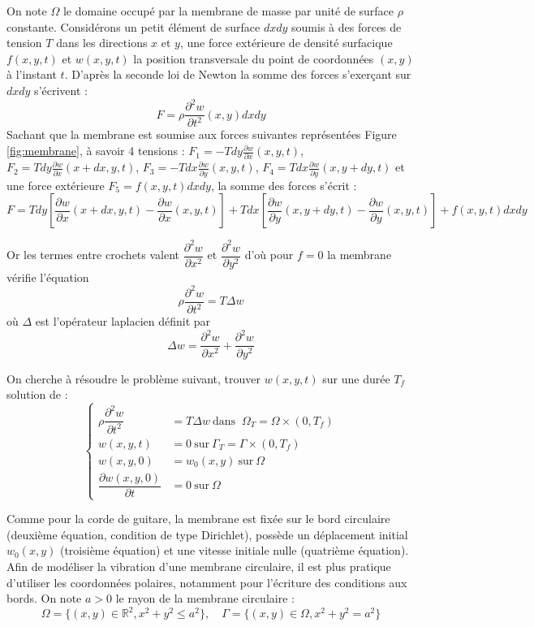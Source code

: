 \documentclass[a4,12pt]{article}
\newcommand{\R}{\mathbb{R}}
\begin{document}
  On note $\Omega$ le domaine occupé par la membrane de masse par unité de surface $\rho$ constante. Considérons un petit élément de surface $dxdy$ soumis à des forces de tension $T$  dans les directions $x$ et $y$, une force extérieure de densité surfacique $f(x,y,t)$ et $w(x,y,t)$ la position transversale du point de coordonnées $(x,y)$ à l'instant $t$. D'après la seconde loi de Newton la somme des forces s'exerçant sur $dxdy$ s'écrivent : 
  \[
    F=\rho  \frac{\partial^2 w}{\partial t^2}(x,y)dxdy
  \]
  Sachant que la membrane est soumise aux forces suivantes représentées Figure \ref{fig:membrane}, à savoir 4 tensions : $F_1=-Tdy\frac{\partial w}{\partial x}(x,y,t)$, $F_2=Tdy\frac{\partial w}{\partial x}(x+dx,y,t)$, $F_3=-Tdx\frac{\partial w}{\partial y}(x,y,t)$, $F_4=Tdx\frac{\partial w}{\partial y}(x,y+dy,t)$ et une force extérieure $F_5=f(x,y,t)dxdy$, la somme des forces s'écrit : 
  \[
    F=Tdy\left[\frac{\partial w}{\partial x}(x+dx,y,t)-\frac{\partial w}{\partial x}(x,y,t)\right]+Tdx\left[\frac{\partial w}{\partial y}(x,y+dy,t)-\frac{\partial w}{\partial y}(x,y,t)\right]+f(x,y,t)dxdy
  \]

  Or les termes entre crochets valent $\dfrac{\partial^2 w}{\partial x^2}$ et $\dfrac{\partial^2 w}{\partial y^2}$ d'où pour $f=0$ la membrane vérifie l'équation 
  \[
    \rho \dfrac{\partial^2 w}{\partial t^2}=T \Delta w
  \]
  où $\Delta$ est l'opérateur laplacien définit par 
  \[
    \Delta w=\dfrac{\partial^2 w}{\partial x^2}+\dfrac{\partial^2 w}{\partial y^2}
  \]


  On cherche à résoudre le problème suivant, trouver $w(x,y,t)$ sur une durée $T_f$ solution de :
  \begin{equation}
    \left\{
      \begin{array}{rl}
	\rho \dfrac{\partial^2 w}{\partial t^2} & =  T \Delta w ~\textrm{dans } ~ \Omega_T = \Omega \times (0,T_f)\\ 
	w(x,y,t)& =  0 ~\textrm{sur} ~ \Gamma_T=\Gamma \times (0,T_f)\\
	w(x,y,0)& = w_0(x,y) ~ \textrm{sur} ~\Omega \\
	\dfrac{\partial w(x,y,0)}{\partial t} & = 0 ~\textrm{sur} ~\Omega 
      \end{array}
      \right.
      \label{eq:membranemodel}
    \end{equation}

    Comme pour la corde de guitare, la membrane est fixée sur le bord circulaire (deuxième équation, condition de type Dirichlet), possède un déplacement initial $w_0(x,y)$ (troisième équation) et une vitesse initiale nulle (quatrième équation). Afin de modéliser la vibration d'une membrane circulaire, il est plus pratique d'utiliser les coordonnées polaires, notamment pour l'écriture des conditions aux bords. On note $a>0$ le rayon de la membrane circulaire : 
    \[
      \Omega=\{(x,y)\in \R^2, x^2+y^2 \leq a^2\}, \quad \Gamma=\{(x,y)\in \Omega,  x^2+y^2 = a^2\}
    \]
\end{document}
